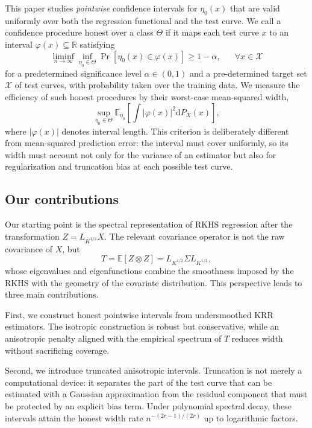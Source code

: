 \documentclass[aos]{imsart}
\newcommand{\ud}{\mathrm d}
\theoremstyle{plain}
\theoremstyle{definition}
\theoremstyle{definition}
\begin{document}
This paper studies \emph{pointwise} confidence intervals for $\eta_0(x)$ that are valid uniformly over both the regression functional and the test curve. We call a confidence procedure honest over a class $\Theta$ if it maps each test curve $x$ to an interval $\varphi(x)\subseteq\mathbb R$ satisfying
\begin{equation}
\liminf_{n\to\infty}\inf_{\eta_0\in\Theta} \Pr\left[\eta_0(x)\in\varphi(x)\right] \geq 1-\alpha,\;\;\;\;\;\;\forall x\in\mathcal X
\label{eq:honest-ci}
\end{equation}
for a predetermined significance level $\alpha\in(0,1)$ and a pre-determined target set $\mathcal X$ of test curves, with probability taken over the training data. We measure the efficiency of such honest procedures by their worst-case mean-squared width,
\begin{equation}
\sup_{\eta_0\in\Theta}\mathbb E_{\eta_0} \left[\int\big|\varphi(x)\big|^2\ud P_X(x)\right],
\label{eq:adaptive}
\end{equation}
where $|\varphi(x)|$ denotes interval length. This criterion is deliberately different from mean-squared prediction error: the interval must cover uniformly, so its width must account not only for the variance of an estimator but also for regularization and truncation bias at each possible test curve.

\subsection{Our contributions}

Our starting point is the spectral representation of RKHS regression after the transformation $Z=L_{K^{1/2}}X$. The relevant covariance operator is not the raw covariance of $X$, but
\[
T=\mathbb E[Z\otimes Z]=L_{K^{1/2}}\Sigma L_{K^{1/2}},
\]
whose eigenvalues and eigenfunctions combine the smoothness imposed by the RKHS with the geometry of the covariate distribution. This perspective leads to three main contributions.

First, we construct honest pointwise intervals from undersmoothed KRR estimators. The isotropic construction is robust but conservative, while an anisotropic penalty aligned with the empirical spectrum of $T$ reduces width without sacrificing coverage.

Second, we introduce truncated anisotropic intervals. Truncation is not merely a computational device: it separates the part of the test curve that can be estimated with a Gaussian approximation from the residual component that must be protected by an explicit bias term. Under polynomial spectral decay, these intervals attain the honest width rate $n^{-(2r-1)/(2r)}$ up to logarithmic factors.
\end{document}
